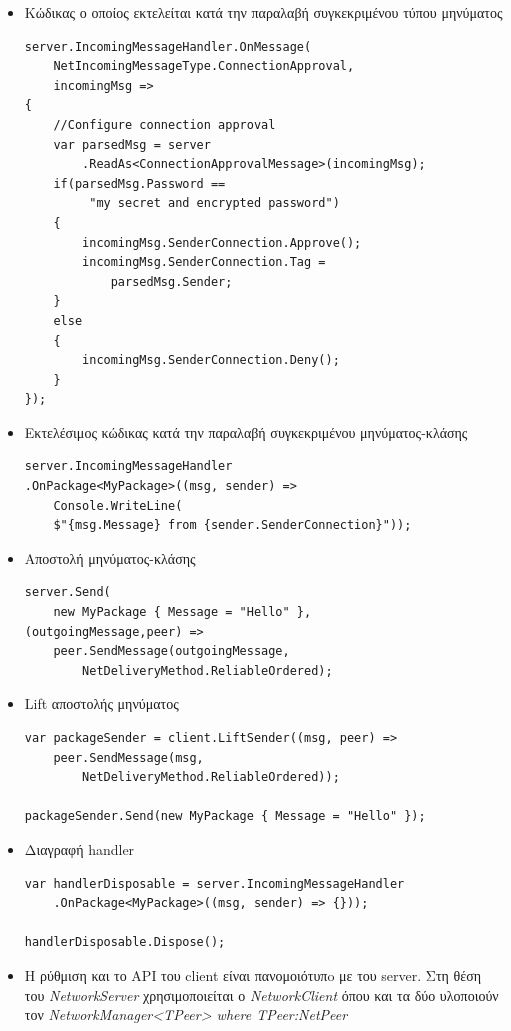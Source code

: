 \begin{itemize}
		\item Κώδικας ο οποίος εκτελείται κατά την παραλαβή συγκεκριμένου τύπου μηνύματος
		\lstset{style=sharpc}
		\begin{lstlisting}
server.IncomingMessageHandler.OnMessage(
	NetIncomingMessageType.ConnectionApproval, 
	incomingMsg =>
{
	//Configure connection approval
	var parsedMsg = server
		.ReadAs<ConnectionApprovalMessage>(incomingMsg);
	if(parsedMsg.Password ==
		 "my secret and encrypted password")
	{
		incomingMsg.SenderConnection.Approve();
		incomingMsg.SenderConnection.Tag = 
			parsedMsg.Sender;
	}
	else
	{
		incomingMsg.SenderConnection.Deny();
	}
});
		\end{lstlisting}
		\item Εκτελέσιμος κώδικας κατά την παραλαβή συγκεκριμένου μηνύματος-κλάσης
		\lstset{style=sharpc}
		\begin{lstlisting}
server.IncomingMessageHandler
.OnPackage<MyPackage>((msg, sender) => 
	Console.WriteLine(
	$"{msg.Message} from {sender.SenderConnection}"));
		\end{lstlisting}	
		\item Αποστολή μηνύματος-κλάσης
		\lstset{style=sharpc}
		\begin{lstlisting}
server.Send(
	new MyPackage { Message = "Hello" },
(outgoingMessage,peer) => 
	peer.SendMessage(outgoingMessage,
		NetDeliveryMethod.ReliableOrdered);
		\end{lstlisting}		
		\item Lift αποστολής μηνύματος
		\lstset{style=sharpc}
		\begin{lstlisting}
var packageSender = client.LiftSender((msg, peer) =>
	peer.SendMessage(msg, 
		NetDeliveryMethod.ReliableOrdered));
		
packageSender.Send(new MyPackage { Message = "Hello" });	
		\end{lstlisting}	
		\item Διαγραφή handler
		\lstset{style=sharpc}
		\begin{lstlisting}	
var handlerDisposable = server.IncomingMessageHandler
	.OnPackage<MyPackage>((msg, sender) => {}));
		
handlerDisposable.Dispose();	
		\end{lstlisting}		
		\item Η ρύθμιση και το API του client είναι πανομοιότυπo με του server. Στη θέση του \textit{NetworkServer} χρησιμοποιείται ο \textit{NetworkClient} όπου και τα δύο υλοποιούν τον \textit{NetworkManager<TPeer> where TPeer:NetPeer}		
	\end{itemize}
	
